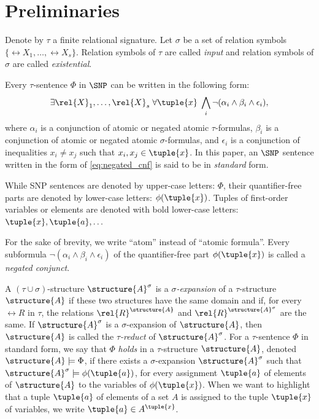 \documentclass{lmcs}
\begin{document}
\section{Preliminaries}\label{section:preliminaries}


Denote by $\tau$ a finite relational signature.
%
Let $\sigma$ be a set of relation symbols $\{ \rel{X}_1,\ldots,  \rel{X}_s\}$.
%
Relation symbols of $\tau$ are called \emph{input} and relation symbols of $\sigma$ are called \emph{existential}. 
%

Every $\tau$-sentence $\Phi$ in $\SNP$ can be written in the following form:
\begin{equation}\label{eq:negated_cnf}
\exists \rel{X}_1,\ldots,  \rel{X}_s\;\forall\tuple{x} \; \bigwedge_i \neg (\alpha_i\wedge\beta_i\wedge \epsilon_i),
\end{equation}
where $\alpha_i$ is a conjunction of atomic or negated atomic $\tau$-formulas, $\beta_i$ is a conjunction of atomic or negated atomic $\sigma$-formulas, and $\epsilon_i$ is a conjunction of inequalities $x_i\not=x_j$ such that $x_i,x_j\in\tuple{x}$.
%
In this paper, an $\SNP$ sentence written in the form of \cref{eq:negated_cnf} is said to be in \emph{standard} form.

While SNP sentences are denoted by upper-case letters: $\Phi$, their quantifier-free parts are denoted by lower-case letters: $\phi(\tuple{x})$.
%
Tuples of first-order variables or elements are denoted with bold lower-case letters: $\tuple{x},\tuple{a},\dots$ 
%

For the sake of brevity, we write ``atom'' instead of ``atomic formula''.
Every subformula $\neg (\alpha_i\wedge\beta_i\wedge\epsilon_i)$ of the quantifier-free part $\phi(\tuple{x})$ is called a \emph{negated conjunct}.


A $(\tau\cup\sigma)$-structure $\structure{A}^\sigma$ is a \emph{$\sigma$-expansion} of a $\tau$-structure $\structure{A}$ if these two structures have the same domain and if, for every $\rel{R}$ in $\tau$, the relations $\rel{R}^{\structure{A}}$ and $\rel{R}^{\structure{A}^\sigma}$ are the same.
%
If $\structure{A}^\sigma$ is a $\sigma$-expansion of $\structure{A}$, then $\structure{A}$ is called the \emph{$\tau$-reduct} of $\structure{A}^\sigma$.
%
For a $\tau$-sentence $\Phi$ in standard form, we say that $\Phi$ \emph{holds} in a $\tau$-structure $\structure{A}$, denoted $\structure{A}\models\Phi$, if there exists a $\sigma$-expansion $\structure{A}^\sigma$ such that $\structure{A}^\sigma\models\phi(\tuple{a})$, for every assignment $\tuple{a}$ of elements of $\structure{A}$ to the variables of $\phi(\tuple{x})$.
%
When we want to highlight that a tuple $\tuple{a}$ of elements of a set $A$ is assigned to the tuple $\tuple{x}$ of variables, we write $\tuple{a}\in A^{\tuple{x}}$.
\end{document}
